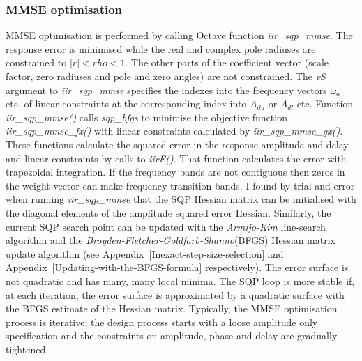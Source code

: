 \documentclass[a4paper,twoside,10pt,english]{report}
\begin{document}
\subsubsection{MMSE optimisation}
MMSE optimisation is performed by calling Octave function \emph{iir\_sqp\_mmse}.
The response error is minimised
while the real and complex pole radiuses are constrained to 
$\left|r\right|<rho<1$.
The other parts of the coefficient vector (scale factor, zero radiuses and 
pole and zero angles) are not constrained. The \emph{vS} argument to
\emph{iir\_sqp\_mmse} specifies the indexes into the frequency vectors
$\omega_{a}$ etc. of linear constraints at the corresponding index into
$A_{du}$ or $A_{dl}$ etc. Function \emph{iir\_sqp\_mmse()}
calls \emph{sqp\_bfgs} to minimise the objective function 
\emph{iir\_sqp\_mmse\_fx()} with linear constraints calculated by
\emph{iir\_sqp\_mmse\_gx()}. These functions calculate the squared-error in the
response amplitude and delay and linear constraints by calls to \emph{iirE()}.
That function calculates the error
with trapezoidal integration. If the frequency bands are not contiguous then
zeros in the weight vector can make frequency transition bands. I found
by trial-and-error when running \emph{iir\_sqp\_mmse} that the SQP Hessian
matrix can be initialised with the diagonal elements of the amplitude squared
error Hessian. Similarly, the current SQP search point can be updated with the
\emph{Armijo-Kim} line-search algorithm and the 
\emph{Broyden-Fletcher-Goldfarb-Shanno}(BFGS) Hessian matrix update algorithm 
(see Appendix~\ref{Inexact-step-size-selection} and
Appendix~\ref{Updating-with-the-BFGS-formula} respectively). The error surface
is not quadratic and has many, many local minima. The SQP loop is more stable
if, at each iteration, the error surface is approximated by a quadratic surface
with the BFGS estimate of the Hessian matrix. Typically, the MMSE optimisation
process is iterative; the design process starts with a loose amplitude only
specification and the constraints on amplitude, phase and delay are gradually
tightened. 
\end{document}
